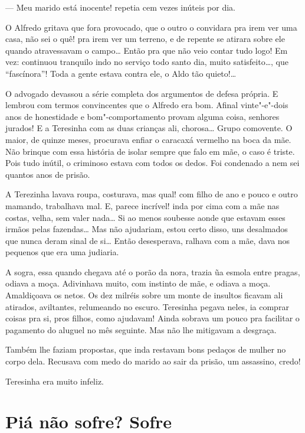 \begin{linenumbers}
--- Meu marido está inocente! repetia cem vezes inúteis por dia.

O Alfredo gritava que fora provocado, que o outro o convidara pra irem
ver uma casa, não sei o quê! pra irem ver um terreno, e de repente se
atirara sobre ele quando atravessavam o campo\ldots{} Então pra que não veio
contar tudo logo! Em vez: continuou tranquilo indo no serviço todo santo
dia, muito satisfeito\ldots{}, que ``fascínora''! Toda a gente estava contra
ele, o Aldo tão quieto!\ldots{}

O advogado devassou a série completa dos argumentos de defesa própria. E
lembrou com termos convincentes que o Alfredo era bom. Afinal
vinte"-e"-dois anos de honestidade e bom"-comportamento provam alguma
coisa, senhores jurados! E a Teresinha com as duas crianças ali,
chorosa\ldots{} Grupo comovente. O maior, de quinze meses, procurava enfiar o
caracaxá vermelho na boca da mãe. Não brinque com essa história de
isolar sempre que falo em mãe, o caso é triste. Pois tudo inútil, o
criminoso estava com todos os dedos. Foi condenado a nem sei quantos
anos de prisão.

A Terezinha lavava roupa, costurava, mas qual! com filho de ano e pouco
e outro mamando, trabalhava mal. E, parece incrível! inda por cima com a
mãe nas costas, velha, sem valer nada\ldots{} Si ao menos soubesse aonde que
estavam esses irmãos pelas fazendas\ldots{} Mas não ajudariam, estou certo
disso, uns desalmados que nunca deram sinal de si\ldots{} Então desesperava,
ralhava com a mãe, dava nos pequenos que era uma judiaria.

A sogra, essa quando chegava até o porão da nora, trazia ũa esmola entre
pragas, odiava a moça. Adivinhava muito, com instinto de mãe, e odiava a
moça. Amaldiçoava os netos. Os dez milréis sobre um monte de insultos
ficavam ali atirados, aviltantes, relumeando no escuro. Teresinha pegava
neles, ia comprar coisas pra si, pros filhos, como ajudavam! Ainda
sobrava um pouco pra facilitar o pagamento do aluguel no mês seguinte.
Mas não lhe mitigavam a desgraça.

Também lhe faziam propostas, que inda restavam bons pedaços de mulher no
corpo dela. Recusava com medo do marido ao sair da prisão, um assassino,
credo!

Teresinha era muito infeliz.
\end{linenumbers}

\chapter{Piá não sofre? Sofre}

